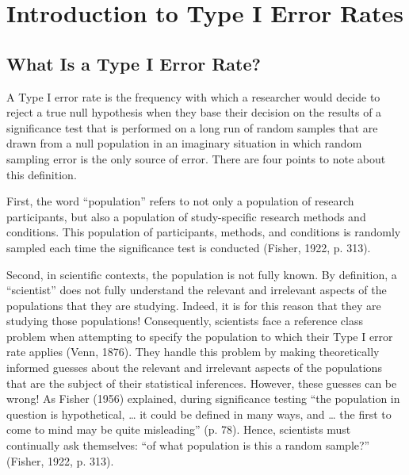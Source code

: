 \documentclass[authordate, meta]{jote-new-article}
\begin{document}
	\section{Introduction to Type I Error Rates}



	\subsection{What Is a Type I Error Rate?}



	A Type I error rate is the frequency with which a researcher would decide to reject a true null hypothesis when they base their decision on the results of a significance test that is performed on a long run of random samples that are drawn from a null population in an imaginary situation in which random sampling error is the only source of error. There are four points to note about this definition.



	First, the word “population” refers to not only a population of research participants, but also a population of study-specific research methods and conditions. This population of participants, methods, and conditions is randomly sampled each time the significance test is conducted (Fisher, 1922, p. 313).



	Second, in scientific contexts, the population is not fully known. By definition, a “scientist” does not fully understand the relevant and irrelevant aspects of the populations that they are studying. Indeed, it is for this reason that they are studying those populations! Consequently, scientists face a reference class problem when attempting to specify the population to which their Type I error rate applies (Venn, 1876). They handle this problem by making theoretically informed guesses about the relevant and irrelevant aspects of the populations that are the subject of their statistical inferences. However, these guesses can be wrong! As Fisher (1956) explained, during significance testing “the population in question is hypothetical, … it could be defined in many ways, and … the first to come to mind may be quite misleading” (p. 78). Hence, scientists must continually ask themselves: “of what population is this a random sample?” (Fisher, 1922, p. 313).
\end{document}
